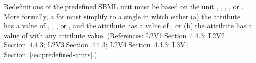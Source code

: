 Redefinitions of the predefined SBML unit  must be based on the
unit , , , , or
.  More formally, a \UnitDefinition for
 must simplify to a single \Unit in which either
(a) the  attribute has a value of ,
, , or , and the 
attribute has a value of , or (b) the  attribute has a
value of  with any  attribute value.
(References: L2V1 Section~4.4.3; L2V2 Section~4.4.3; L2V3
Section~4.4.3; L2V4 Section~4.4.3; L3V1 Section~\ref{sec:predefined-units}.)
